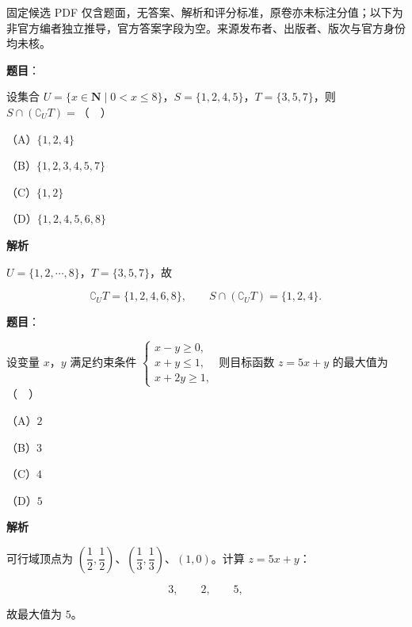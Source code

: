 

\begin{gktip}
固定候选 PDF 仅含题面，无答案、解析和评分标准，原卷亦未标注分值；以下为非官方编者独立推导，官方答案字段为空。来源发布者、出版者、版次与官方身份均未核。
\end{gktip}

\begin{answer}

\textbf{题目}：

设集合 $U=\{x\in\mathbf N\mid0<x\leqslant8\}$，$S=\{1,2,4,5\}$，$T=\{3,5,7\}$，则 $S\cap(\complement_UT)=$（　）

（A）$\{1,2,4\}$

（B）$\{1,2,3,4,5,7\}$

（C）$\{1,2\}$

（D）$\{1,2,4,5,6,8\}$

\textbf{解析}

$U=\{1,2,\cdots,8\}$，$T=\{3,5,7\}$，故

\nopagebreak[4]
\[\complement_UT=\{1,2,4,6,8\},\qquad S\cap(\complement_UT)=\{1,2,4\}.\]


\end{answer}
\begin{answer}

\textbf{题目}：

设变量 $x$，$y$ 满足约束条件 $\begin{cases}x-y\geqslant0,\\ x+y\leqslant1,\\ x+2y\geqslant1,\end{cases}$ 则目标函数 $z=5x+y$ 的最大值为（　）

（A）$2$

（B）$3$

（C）$4$

（D）$5$

\textbf{解析}

可行域顶点为 $\left(\dfrac12,\dfrac12\right)$、$\left(\dfrac13,\dfrac13\right)$、$(1,0)$。计算 $z=5x+y$：

\nopagebreak[4]
\[3,\qquad 2,\qquad 5,\]

故最大值为 $5$。


\end{answer}
